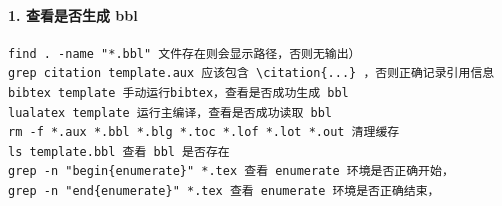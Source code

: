 \paragraph{1. 查看是否生成 bbl}

\begin{verbatim}
find . -name "*.bbl" 文件存在则会显示路径，否则无输出）
grep citation template.aux 应该包含 \citation{...} ，否则正确记录引用信息
bibtex template 手动运行bibtex，查看是否成功生成 bbl
lualatex template 运行主编译，查看是否成功读取 bbl
rm -f *.aux *.bbl *.blg *.toc *.lof *.lot *.out 清理缓存
ls template.bbl 查看 bbl 是否存在
grep -n "begin{enumerate}" *.tex 查看 enumerate 环境是否正确开始，
grep -n "end{enumerate}" *.tex 查看 enumerate 环境是否正确结束，
\end{verbatim}
